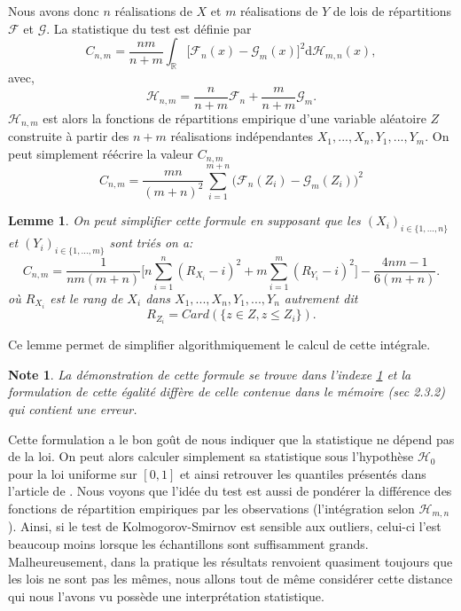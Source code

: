 \documentclass[a4paper,11pt]{article}
\numberwithin{equation}{section}
\newtheorem{lemma}{Lemme}
\newtheorem{note}{Note}
\begin{document}
Nous avons donc $n$ réalisations de $X$ et $m$ réalisations de $Y$ de lois de répartitions $\mathcal{F}$ et $\mathcal{G}$.
La statistique du test est définie par
\begin{equation}
	C_{n,m}=\frac{nm}{n+m}\int_{\mathbb{R}}\big[ \mathcal{F}_{n}(x)-\mathcal{G}_{m}(x)\big]^{2} \mathrm{d} \mathcal{H}_{m,n}(x),
\end{equation}
avec,
\begin{equation}
	\mathcal{H}_{n,m}=\frac{n}{n+m}\mathcal{F}_n+\frac{m}{n+m}\mathcal{G}_m.
\end{equation}
$\mathcal{H}_{n,m}$ est alors la fonctions de répartitions empirique d'une variable aléatoire $Z$ construite à partir des $n+m$ réalisations indépendantes $X_1,...,X_n,Y_1,...,Y_m$. On peut simplement réécrire la valeur $C_{n,m}$
\begin{equation}
	C_{n,m}=\frac{mn}{(m+n)^2}\sum_{i=1}^{m+n}\big(\mathcal{F}_n(Z_i)-\mathcal{G}_{m}(Z_i)\big)^2
\end{equation}

\begin{lemma}
	\label{C-v}
	On peut simplifier cette formule en supposant que les $(X_i)_{i\in \{1,...,n\}}$ et $(Y_i)_{i\in \{1,...,m\}}$ sont triés on a:
	\begin{equation}
		C_{n,m}=\frac{1}{nm(m+n)}\Big[ n\sum_{i=1}^{n}(R_{X_i}-i)^2+ m\sum_{i=1}^{m}(R_{Y_i}-i)^2\Big]-\frac{4nm-1}{6(m+n)}.
	\end{equation}
	où $R_{X_i}$ est le rang de $X_i$ dans $X_1,...,X_n,Y_1,...,Y_n$ autrement dit 
	\[R_{Z_i}=Card(\{z\in Z, z\leq Z_i\}).\] 
\end{lemma}
Ce lemme permet de simplifier algorithmiquement le calcul de cette intégrale.
\begin{note}
	La démonstration de cette formule se trouve dans l'indexe \ref{C-v} et la formulation de cette égalité diffère de celle contenue dans le mémoire \cite{ethier2011propos}(sec 2.3.2) qui contient une erreur.
\end{note}
Cette formulation a le bon goût de nous indiquer que la statistique ne dépend pas de la loi. On peut alors calculer simplement sa statistique sous l'hypothèse $\mathcal{H}_0$ pour la loi uniforme sur $[0,1]$ et ainsi retrouver les quantiles présentés dans l'article de \cite{buning2002robustness}. Nous voyons que l'idée du test est aussi de pondérer la différence des fonctions de répartition empiriques par les observations (l'intégration selon $\mathcal{H}_{m,n}$). Ainsi, si le test de Kolmogorov-Smirnov est sensible aux outliers, celui-ci l’est beaucoup moins lorsque les échantillons sont suffisamment grands. Malheureusement, dans la pratique les résultats renvoient quasiment toujours que les lois ne sont pas les mêmes, nous allons tout de même considérer cette distance qui nous l'avons vu possède une interprétation statistique.  
\end{document}
